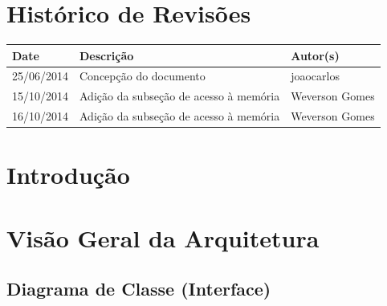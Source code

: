 \documentclass{report}
\begin{document}
\capa
%

\chapter*{Histórico de Revisões}
  \vspace*{1cm}
  \begin{table}[ht]
    \centering
    \begin{tabular}[pos]{|m{2cm} | m{8cm} | m{4cm}|} 
      \hline
      \cellcolor[gray]{0.9}
      \textbf{Date} & \cellcolor[gray]{0.9}\textbf{Descrição} & \cellcolor[gray]{0.9}\textbf{Autor(s)}\\
      \hline
      25/06/2014 &  Concepção do documento & joaocarlos \\ \hline
      15/10/2014 &  Adição da subseção de acesso à memória & Weverson Gomes \\ \hline
      16/10/2014 &  Adição da subseção de acesso à memória & Weverson Gomes \\ \hline
    \end{tabular}
  \end{table}

\tableofcontents

\chapter{Introdução}
  
	

\chapter{Visão Geral da Arquitetura}

	
	
	
	
	

  \section{Diagrama de Classe (Interface)}
  \begin{figure}[H]
    \centering
    
  \end{figure}
\end{document}
